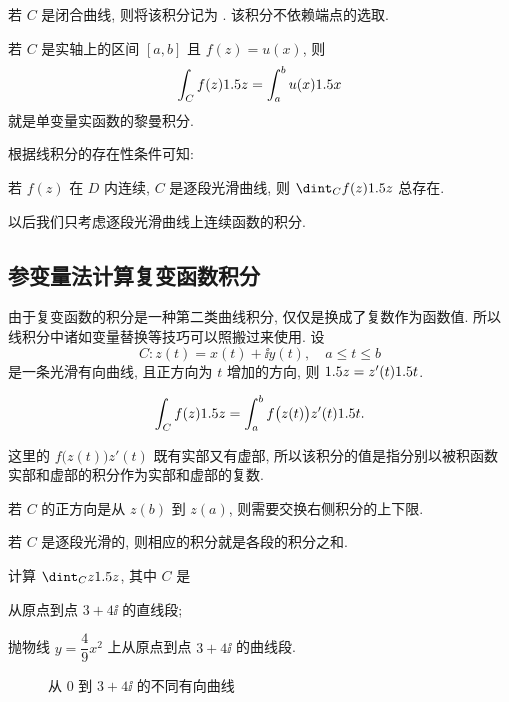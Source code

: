 若 $C$ 是闭合曲线, 则将该积分记为 .
该积分不依赖端点的选取.

若 $C$ 是实轴上的区间 $[a,b]$ 且 $f(z)=u(x)$, 则
\[
  \int_C f(z)1.5 z=\int_a^b u(x)1.5 x
\]
就是单变量实函数的黎曼积分.

根据线积分的存在性条件可知:
\begin{theorem}
  若 $f(z)$ 在 $D$ 内连续, $C$ 是逐段光滑曲线, 则 $\dint_C f(z)\d z$ 总存在.
\end{theorem}

以后我们\alert{只考虑逐段光滑曲线上连续函数的积分}.


\subsection{参变量法计算复变函数积分}

由于复变函数的积分是一种第二类曲线积分, 仅仅是换成了复数作为函数值.
所以线积分中诸如变量替换等技巧可以照搬过来使用. 设
\[
  C:z(t)=x(t)+\ii y(t),\quad a\le t\le b
\]
是一条光滑有向曲线, 且正方向为 $t$ 增加的方向, 则 $1.5 z=z'(t)1.5 t$.

\begin{theorem}
  \[
    \int_C f(z)1.5 z=\int_a^b f\bigl(z(t)\bigr)z'(t)1.5 t.
  \]
\end{theorem}

这里的 $f\bigl(z(t)\bigr)z'(t)$ 既有实部又有虚部, 所以该积分的值是指分别以被积函数实部和虚部的积分作为实部和虚部的复数.

若 $C$ 的正方向是从 $z(b)$ 到 $z(a)$, 则需要交换右侧积分的上下限.

若 $C$ 是逐段光滑的, 则相应的积分就是各段的积分之和.

\begin{example}
  \label{exam:integral-z}
  计算 $\dint_Cz\d z$, 其中 $C$ 是
  \begin{subexample}
    \item 从原点到点 $3+4\ii$ 的直线段;
    \item 抛物线 $y=\dfrac49x^2$ 上从原点到点 $3+4\ii$ 的曲线段.
  \end{subexample}
\end{example}

\begin{figure}[!hbt]
  \centering
  \caption{从 $0$ 到 $3+4\ii$ 的不同有向曲线}
\end{figure}

